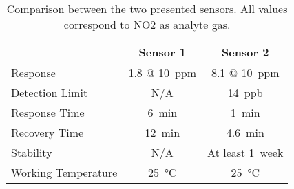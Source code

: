 \begin{table}[]
\centering
\begin{tabular}{lcc}
                    & Sensor 1 & Sensor 2 \\
                    \hline \hline
Response &   1.8 @ \SI{10}{ppm}        &   8.1 @ \SI{10}{ppm}       \\
\hline
Detection Limit    &    N/A      &   \SI{14}{ppb}       \\
\hline
Response Time       &      \SI{6}{\minute}   &  \SI{1}{\minute}        \\
\hline
Recovery Time       &      \SI{12}{\minute}   &  \SI{4.6}{\minute}        \\
\hline
Stability           &      N/A    &   At least \SI{1}{week}       \\
\hline
Working Temperature &      \SI{25}{\celsius}    &  \SI{25}{\celsius} \\
\hline \hline
\end{tabular}
\caption{Comparison between the two presented sensors. All values correspond to NO2 as analyte gas.}
\label{tab:comparison}
\end{table}